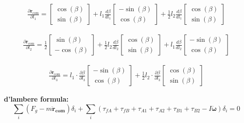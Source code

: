 \documentclass[10pt]{article}
\begin{document}
\begin{align*}
\frac{\partial \mathbf{r}_{\mathrm{com}}}{\partial l_1} =
\begin{bmatrix}
\cos(\beta) \\
\sin(\beta)
\end{bmatrix}
+
l_1 \frac{d\beta}{d l_1}
\begin{bmatrix}
- \sin(\beta) \\
\cos(\beta)
\end{bmatrix}
+
\frac{1}{2} l_2 \frac{d\beta}{d l_1}
\begin{bmatrix}
\cos(\beta) \\
\sin(\beta)
\end{bmatrix}
\end{align*}

\begin{align*}
\frac{\partial \mathbf{r}_{\mathrm{com}}}{\partial l_2} =
\frac{1}{2}
\begin{bmatrix}
\sin(\beta) \\
-\cos(\beta)
\end{bmatrix}
+
\frac{1}{2} l_2 \frac{d\beta}{d l_2}
\begin{bmatrix}
\cos(\beta) \\
\sin(\beta)
\end{bmatrix}
+
l_1\frac{d\beta}{d l_2}
\begin{bmatrix}
- \sin(\beta) \\
\cos(\beta)
\end{bmatrix}
\end{align*}

\begin{align*}
\frac{\partial \mathbf{r}_{\mathrm{com}}}{\partial l_3} =
l_1 \cdot \frac{\partial \beta}{\partial l_3}
\begin{bmatrix}
- \sin(\beta) \\
\cos(\beta)
\end{bmatrix}
+
\frac{1}{2} l_2 \cdot \frac{\partial \beta}{\partial l_3}
\begin{bmatrix}
\cos(\beta) \\
\sin(\beta)
\end{bmatrix}
\end{align*}

\textbf{d'lambere formula: }
\[
\sum_i (F_g - m \mathbf{\ddot{r}_{com}})\delta_i 
+ \sum_i (\tau_{fA} + \tau_{fB} + \tau_{A1} + \tau_{A2} + \tau_{B1} + \tau_{B2} 
- I \mathbf{\ddot{\omega}})\delta_i = 0
\]
\end{document}

